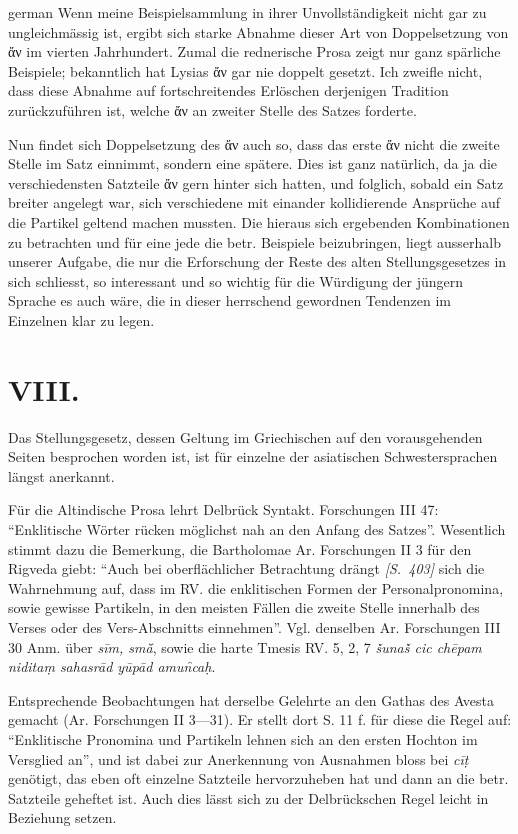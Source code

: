 \begin{otherlanguage*}{german}
Wenn meine Beispielsammlung in ihrer Unvollständigkeit nicht gar zu ungleichmässig ist, ergibt sich starke Abnahme dieser Art von Doppelsetzung von ἄν im vierten Jahrhundert. Zumal die rednerische Prosa zeigt nur ganz spärliche Beispiele; bekanntlich hat Lysias ἄν gar nie doppelt gesetzt. Ich zweifle nicht, dass diese Abnahme auf fortschreitendes Erlöschen derjenigen Tradition zurückzuführen ist, welche ἄν an zweiter Stelle des Satzes forderte.

Nun findet sich Doppelsetzung des ἄν auch so, dass das erste ἄν nicht die zweite Stelle im Satz einnimmt, sondern eine spätere. Dies ist ganz natürlich, da ja die verschiedensten Satzteile ἄν gern hinter sich hatten, und folglich, sobald ein Satz breiter angelegt war, sich verschiedene mit einander kollidierende Ansprüche auf die Partikel geltend machen mussten. Die hieraus sich ergebenden Kombinationen zu betrachten und für eine jede die betr. Beispiele beizubringen, liegt ausserhalb unserer Aufgabe, die nur die Erforschung der Reste des alten Stellungsgesetzes in sich schliesst, so interessant und so wichtig für die Würdigung der jüngern Sprache es auch wäre, die in dieser herrschend gewordnen Tendenzen im Einzelnen klar zu legen.

\section*{VIII.}

Das Stellungsgesetz, dessen Geltung im Griechischen auf den vorausgehenden Seiten besprochen worden ist, ist für einzelne der asiatischen Schwestersprachen längst anerkannt.

Für die Altindische Prosa lehrt Delbrück Syntakt. Forschungen III 47: “Enklitische Wörter rücken möglichst nah an den Anfang des Satzes”. Wesentlich stimmt dazu die Bemerkung, die Bartholomae Ar. Forschungen II 3 für den Rigveda giebt: “Auch bei oberflächlicher Betrachtung drängt \hypertarget{p403}{\emph{[S.~403]}}\label{p403} sich die Wahrnehmung auf, dass im RV. die enklitischen Formen der Personalpronomina, sowie gewisse Partikeln, in den meisten Fällen die zweite Stelle innerhalb des Verses oder des Vers-Abschnitts einnehmen”. Vgl. denselben Ar. Forschungen III 30 Anm. über \emph{sīm, smā̆}, sowie die harte Tmesis RV. 5, 2, 7 \emph{ṧunaṧ cic chēpam niditaṃ sahasrād yūpād amun̑caḥ}.

Entsprechende Beobachtungen hat derselbe Gelehrte an den Gathas des Avesta gemacht (Ar. Forschungen II 3—31). Er stellt dort S. 11 f. für diese die Regel auf: “Enklitische Pronomina und Partikeln lehnen sich an den ersten Hochton im Versglied an”, und ist dabei zur Anerkennung von Ausnahmen bloss bei \emph{cīṭ} genötigt, das eben oft einzelne Satzteile hervorzuheben hat und dann an die betr. Satzteile geheftet ist. Auch dies lässt sich zu der Delbrückschen Regel leicht in Beziehung setzen.


\end{otherlanguage*}
